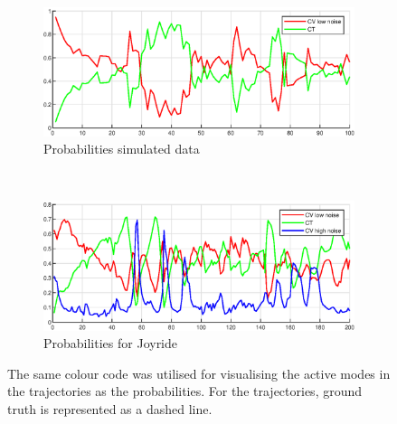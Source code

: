 \begin{figure}[ht]
\begin{subfigure}[h]{0.4\textwidth}
        \label{fig:ga_1_joyride_error}
    \end{subfigure}
        \\
    \begin{subfigure}[h]{0.4\textwidth}
        \includegraphics[width=\textwidth]{figures/ga_1/2_probs}
        \caption{Probabilities simulated data}
        \label{fig:ga_1_2_error}
    \end{subfigure}%
    ~
    \begin{subfigure}[h]{0.4\textwidth}
        \includegraphics[width=\textwidth]{figures/ga_1/joyride_probs}
        \caption{Probabilities for Joyride}
        \label{fig:ga_1_joyride_error}
    \end{subfigure}
    \caption{The same colour code was utilised for visualising the active modes in the trajectories as the probabilities. For the trajectories, ground truth is represented as a dashed line. }
    \label{fig:ga_1} 
\end{figure}






